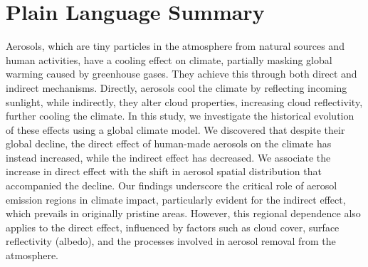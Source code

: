\documentclass[draft]{agujournal2019}
\begin{document}
\section*{Plain Language Summary}
Aerosols, which are tiny particles in the atmosphere from natural sources and human activities, have a cooling effect on climate, partially masking global warming caused by greenhouse gases. They achieve this through both direct and indirect mechanisms. Directly, aerosols cool the climate by reflecting incoming sunlight, while indirectly, they alter cloud properties, increasing cloud reflectivity, further cooling the climate. In this study, we investigate the historical evolution of these effects using a global climate model. We discovered that despite their global decline, the direct effect of human-made aerosols on the climate has instead increased, while the indirect effect has decreased. We associate the increase in direct effect with the shift in aerosol spatial distribution that accompanied the decline. Our findings underscore the critical role of aerosol emission regions in climate impact, particularly evident for the indirect effect, which prevails in originally pristine areas. However, this regional dependence also applies to the direct effect, influenced by factors such as cloud cover, surface reflectivity (albedo), and the processes involved in aerosol removal from the atmosphere.



%
%

%

\end{document}
